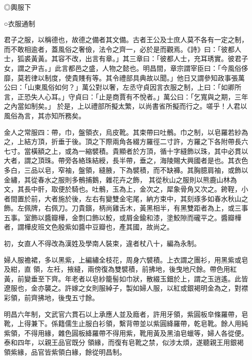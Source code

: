 \begin{pinyinscope}
 ◎輿服下



 ○衣服通制



 君子之服，以稱德也，故德之備者其文備。古者王公及士庶人莫不各有一定之制，而不敢相逾者，蓋風俗之奢儉，法令之齊一，必於是而觀焉。《詩》曰：「彼都人士，狐裘黃黃。其容不改，出言有章。」其三章曰：「彼都人士，充耳琇實。彼君子女，謂之尹吉。」此言都邑之盛，人物之懿也。明昌間，章宗謂宰臣曰：「今風俗侈靡，莫若律以制度，使貴賤有等。其令禮部具典故以聞。」他日又謂參知政事張萬公曰：「山東風俗如何？」萬公對以奢，左丞守貞因言衣服之制，上曰：「如卿所言，正恐失人心耳。」守貞曰：「止是商賈有不悅者。」萬公曰：「乞寬與之期，三年之內當如制矣。」
 於是，上以禮部所擬太繁，以尚書省所擬而行之。嗟乎！人君以風俗為言，其亦知所務矣。



 金人之常服四：帶，巾，盤領衣，烏皮靴。其束帶曰吐鶻。巾之制，以皂羅若紗為之，上結方頂，折垂于後。頂之下際兩角各綴方羅徑二寸許，方羅之下各附帶長六七寸。當橫額之上，或為一縮襞積。貴顯者於方頂，循十字縫飾以珠，其中必貫以大者，謂之頂珠。帶旁各絡珠結綬，長半帶，垂之，海陵賜大興國者是也。其衣色多白，三品以皂，窄袖，盤領，縫腋，下為襞積，而不缺褲。其胸臆肩袖，或飾以金繡，其從春水之服則多鶻捕鵝，雜花卉之飾，
 其從秋山之服則以熊鹿山林為文，其長中骭，取便於騎也。吐鶻，玉為上，金次之，犀象骨角又次之。銙鞓，小者間置於前，大者施於後，左右有變雙金宅尾，納方束中，其刻琢多如春水秋山之飾。左佩牌，右佩刀。刀貴鑌，柄尚雞舌木，黃黑相半，有黑雙距者為上，或三事五事。室飾以醬瓣樺，金剽口飾以鮫，或屑金鍮和漆，塗鮫隙而礲平之。醬瓣樺者，謂樺皮班文色殷紫如醬中豆瓣也，產其國，故尚之。



 初，女直人不得改為漢姓及學南人裝束，違者杖八十，編為永制。



 婦人服襜裙，多以黑紫，上編繡全枝花，周身六襞積。上衣謂之團衫，用黑紫或皂及紺，直
 領，左衽，掖縫，兩傍復為雙襞積，前拂地，後曳地尺餘。帶色用紅黃，前變垂至下齊。年老者以皂紗籠髻如巾狀，散綴玉鈿於上，謂之玉逍遙。此皆遼服也，金亦襲之。許嫁之女則服綽子，製如婦人服，以紅或銀褐明金為之，對襟彩領，前齊拂地，後曳五寸餘。



 明昌六年制，文武官六貫石以上承應人並及廕者，許用牙領，紫圓板皁條羅帶，皂靴，上得兼下。係籍儒生止服白衫領，繫背帶並以紫圓絳羅帶，乾皂靴。餘人用純紫領，不得用緣，雜色圓板絳羅帶不得用紫，靴用黃及黑油皂蠟等，婦人各從便。泰和四年，以親王品官既分
 領緣，而復有皂靴之禁，似涉太煩，遂聽親王用銀褐領紫緣，品官皆紫領白緣，餘從明昌制。




\end{pinyinscope}
